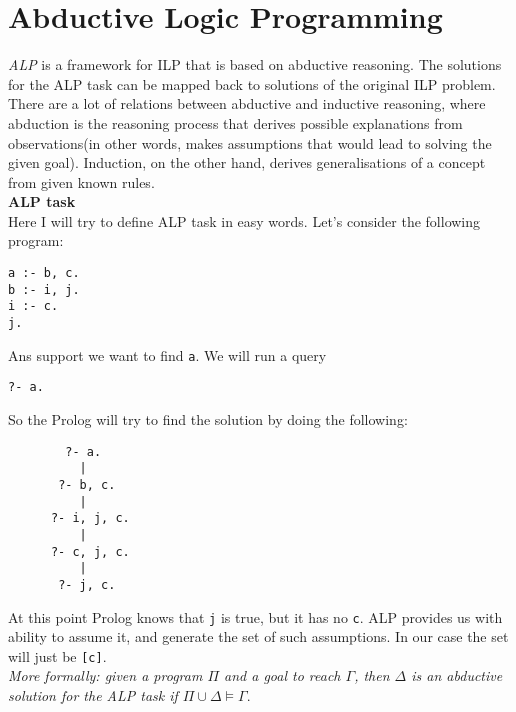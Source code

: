 \documentclass[11pt]{article}
\begin{document}
\section{Abductive Logic Programming}
\emph{ALP} is a framework for ILP that is based on abductive reasoning. The solutions for the ALP task can be mapped back to solutions of the original ILP problem. \\
There are a lot of relations between abductive and inductive reasoning, where abduction is the reasoning process that derives possible explanations from observations(in other words, makes assumptions that would lead to solving the given goal). Induction, on the other hand, derives generalisations of a concept from given known rules.\\

\textbf{ALP task}\\
Here I will try to define ALP task in easy words. Let's consider the following program:
\begin{lstlisting}
a :- b, c.
b :- i, j.
i :- c.
j. 
\end{lstlisting} 
Ans support we want to find \texttt{a}. We will run a query 
\begin{lstlisting}
?- a. 
\end{lstlisting}
So the Prolog will try to find the solution by doing the following:
\begin{lstlisting}
        ?- a.
          |
       ?- b, c.
          |
      ?- i, j, c.
          |
      ?- c, j, c.
          |
       ?- j, c.
\end{lstlisting} 
At this point Prolog knows that \texttt{j} is true, but it has no \texttt{c}. ALP provides us with ability to assume it, and generate the set of such assumptions. In our case the set will just be \texttt{[c]}.\\

\emph{More formally: given a program $\Pi$ and a goal to reach $\Gamma$, then $\Delta$ is an abductive solution for the ALP task if $\Pi \cup \Delta \models \Gamma$}.
\end{document}
